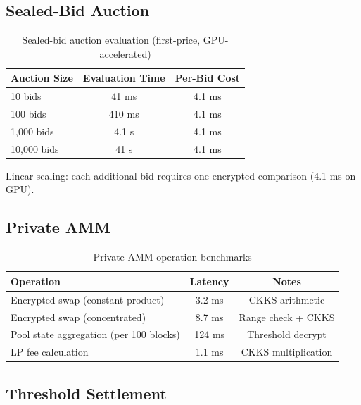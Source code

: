 \documentclass[11pt,letterpaper]{article}
\theoremstyle{definition}
\theoremstyle{remark}
\begin{document}
\subsection{Sealed-Bid Auction}

\begin{table}[h]
\centering
\begin{tabular}{lcc}
\toprule
\textbf{Auction Size} & \textbf{Evaluation Time} & \textbf{Per-Bid Cost} \\
\midrule
10 bids & 41 ms & 4.1 ms \\
100 bids & 410 ms & 4.1 ms \\
1,000 bids & 4.1 s & 4.1 ms \\
10,000 bids & 41 s & 4.1 ms \\
\bottomrule
\end{tabular}
\caption{Sealed-bid auction evaluation (first-price, GPU-accelerated)}
\label{tab:auction_bench}
\end{table}

Linear scaling: each additional bid requires one encrypted comparison (4.1 ms on GPU).

\subsection{Private AMM}

\begin{table}[h]
\centering
\begin{tabular}{lcc}
\toprule
\textbf{Operation} & \textbf{Latency} & \textbf{Notes} \\
\midrule
Encrypted swap (constant product) & 3.2 ms & CKKS arithmetic \\
Encrypted swap (concentrated) & 8.7 ms & Range check + CKKS \\
Pool state aggregation (per 100 blocks) & 124 ms & Threshold decrypt \\
LP fee calculation & 1.1 ms & CKKS multiplication \\
\bottomrule
\end{tabular}
\caption{Private AMM operation benchmarks}
\label{tab:amm_bench}
\end{table}

\subsection{Threshold Settlement}
\end{document}

